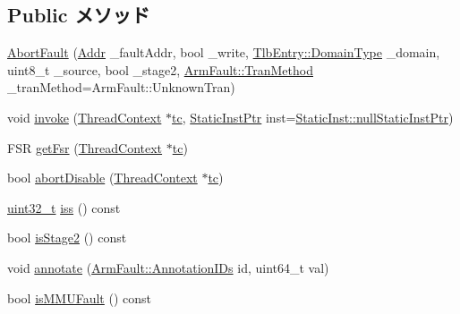 \subsection*{Public メソッド}
\begin{DoxyCompactItemize}
\item 
\hyperlink{classArmISA_1_1AbortFault_a68effcc3ba0f9938e7571ad7dc83ffcf}{AbortFault} (\hyperlink{classm5_1_1params_1_1Addr}{Addr} \_\-faultAddr, bool \_\-write, \hyperlink{structArmISA_1_1TlbEntry_a0595b41cfb7d03f18438f9c355a3469d}{TlbEntry::DomainType} \_\-domain, uint8\_\-t \_\-source, bool \_\-stage2, \hyperlink{classArmISA_1_1ArmFault_ad78237d6390becbe8bdf9e73979c56ae}{ArmFault::TranMethod} \_\-tranMethod=ArmFault::UnknownTran)
\item 
void \hyperlink{classArmISA_1_1AbortFault_a2bd783b42262278d41157d428e1f8d6f}{invoke} (\hyperlink{classThreadContext}{ThreadContext} $\ast$\hyperlink{namespaceArmISA_a5aff829af55e65b802d83dfcef4e9dd0}{tc}, \hyperlink{classRefCountingPtr}{StaticInstPtr} inst=\hyperlink{classStaticInst_aa793d9793af735f09096369fb17567b6}{StaticInst::nullStaticInstPtr})
\item 
FSR \hyperlink{classArmISA_1_1AbortFault_abae0f5c90ba0a6f56bc8df45dbd5861b}{getFsr} (\hyperlink{classThreadContext}{ThreadContext} $\ast$\hyperlink{namespaceArmISA_a5aff829af55e65b802d83dfcef4e9dd0}{tc})
\item 
bool \hyperlink{classArmISA_1_1AbortFault_a92a741baab278ed029d84b0fe979e1b8}{abortDisable} (\hyperlink{classThreadContext}{ThreadContext} $\ast$\hyperlink{namespaceArmISA_a5aff829af55e65b802d83dfcef4e9dd0}{tc})
\item 
\hyperlink{Type_8hh_a435d1572bf3f880d55459d9805097f62}{uint32\_\-t} \hyperlink{classArmISA_1_1AbortFault_a54f4d33ac162a95fd5b3830cf7fab8ff}{iss} () const 
\item 
bool \hyperlink{classArmISA_1_1AbortFault_abb0e34fd2d22460e7779f419601dc6dc}{isStage2} () const 
\item 
void \hyperlink{classArmISA_1_1AbortFault_a1534ab135f3f8a49ad6274389bf77b51}{annotate} (\hyperlink{classArmISA_1_1ArmFault_a955305710181a260a9ee0b419a6027fb}{ArmFault::AnnotationIDs} id, uint64\_\-t val)
\item 
bool \hyperlink{classArmISA_1_1AbortFault_a3839d4e20c8314337d02889689f3c57e}{isMMUFault} () const 
\end{DoxyCompactItemize}
